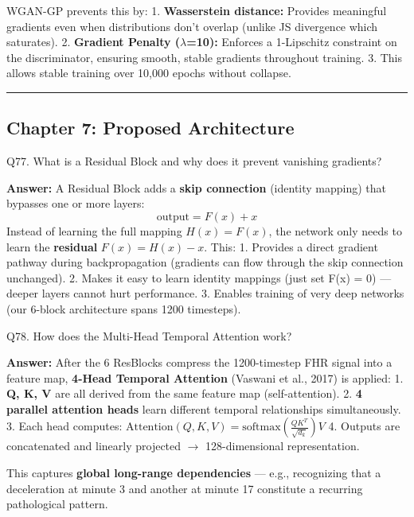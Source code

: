 \documentclass[11pt,a4paper]{article}
\begin{document}
WGAN-GP prevents this by: 1. \textbf{Wasserstein distance:} Provides
meaningful gradients even when distributions don't overlap (unlike JS
divergence which saturates). 2. \textbf{Gradient Penalty ($\lambda$=10):}
Enforces a 1-Lipschitz constraint on the discriminator, ensuring smooth,
stable gradients throughout training. 3. This allows stable training
over 10,000 epochs without collapse.

\begin{center}\rule{0.5\linewidth}{0.5pt}\end{center}

\subsection{Chapter 7: Proposed
Architecture}\label{chapter-7-proposed-architecture}

\begin{questionbox}
Q77. What is a Residual Block and why does it prevent vanishing
gradients?
\end{questionbox}
\textbf{Answer:} A Residual Block adds a \textbf{skip connection} (identity
mapping) that bypasses one or more layers: \[\text{output} = F(x) + x\]
Instead of learning the full mapping \(H(x) = F(x)\), the network only
needs to learn the \textbf{residual} \(F(x) = H(x) - x\). This: 1.
Provides a direct gradient pathway during backpropagation (gradients can
flow through the skip connection unchanged). 2. Makes it easy to learn
identity mappings (just set F(x) = 0) --- deeper layers cannot hurt
performance. 3. Enables training of very deep networks (our 6-block
architecture spans 1200 timesteps).

\begin{questionbox}
Q78. How does the Multi-Head Temporal Attention work?
\end{questionbox}
\textbf{Answer:} After the 6 ResBlocks compress the 1200-timestep FHR signal
into a feature map, \textbf{4-Head Temporal Attention} (Vaswani et al.,
2017) is applied: 1. \textbf{Q, K, V} are all derived from the same
feature map (self-attention). 2. \textbf{4 parallel attention heads}
learn different temporal relationships simultaneously. 3. Each head
computes:
\(\text{Attention}(Q, K, V) = \text{softmax}\left(\frac{QK^T}{\sqrt{d_k}}\right)V\)
4. Outputs are concatenated and linearly projected $\rightarrow$ 128-dimensional
representation.

This captures \textbf{global long-range dependencies} --- e.g.,
recognizing that a deceleration at minute 3 and another at minute 17
constitute a recurring pathological pattern.
\end{document}

